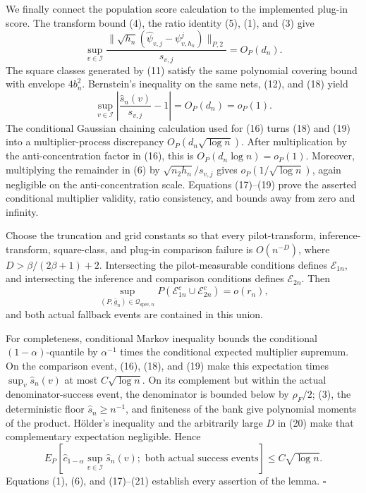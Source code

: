 We finally connect the population score calculation to the implemented plug-in score.  The transform bound (4), the ratio identity (5), (1), and (3) give
\[
 \sup_{v\in\mathcal I}
 \frac{\|\sqrt{h_n}(\widehat\psi_{v,j}-\psi^j_{v,h_n})\|_{P,2}}{s_{v,j}}
 =O_P(d_n). \tag{18}
\]
The square classes generated by (11) satisfy the same polynomial covering bound with envelope \(4b_n^2\).  Bernstein's inequality on the same nets, (12), and (18) yield
\[
 \sup_{v\in\mathcal I}\left|\frac{\widehat s_n(v)}{s_{v,j}}-1\right|=O_P(d_n)=o_P(1). \tag{19}
\]
The conditional Gaussian chaining calculation used for (16) turns (18) and (19) into a multiplier-process discrepancy \(O_P(d_n\sqrt{\log n})\).  After multiplication by the anti-concentration factor in (16), this is \(O_P(d_n\log n)=o_P(1)\).  Moreover, multiplying the remainder in (6) by \(\sqrt{n_2h_n}/s_{v,j}\) gives \(o_P(1/\sqrt{\log n})\), again negligible on the anti-concentration scale.  Equations (17)--(19) prove the asserted conditional multiplier validity, ratio consistency, and bounds away from zero and infinity.

Choose the truncation and grid constants so that every pilot-transform, inference-transform, square-class, and plug-in comparison failure is \(O(n^{-D})\), where \(D>\beta/(2\beta+1)+2\).  Intersecting the pilot-measurable conditions defines \(\mathcal E_{1n}\), and intersecting the inference and comparison conditions defines \(\mathcal E_{2n}\).  Then
\[
 \sup_{(P,\bar g_n)\in\mathcal Q_{\mathrm{spec},n}}
 P(\mathcal E_{1n}^c\cup\mathcal E_{2n}^c)=o(r_n), \tag{20}
\]
and both actual fallback events are contained in this union.

For completeness, conditional Markov inequality bounds the conditional \((1-\alpha)\)-quantile by \(\alpha^{-1}\) times the conditional expected multiplier supremum.  On the comparison event, (16), (18), and (19) make this expectation times \(\sup_v\widehat s_n(v)\) at most \(C\sqrt{\log n}\).  On its complement but within the actual denominator-success event, the denominator is bounded below by \(\rho_F/2\); (3), the deterministic floor \(\widehat s_n\ge n^{-1}\), and finiteness of the bank give polynomial moments of the product.  H\"older's inequality and the arbitrarily large \(D\) in (20) make that complementary expectation negligible.  Hence
\[
 E_P\!\left[\widehat c_{1-\alpha}\sup_{v\in\mathcal I}\widehat s_n(v);
 \text{ both actual success events}\right]\le C\sqrt{\log n}. \tag{21}
\]
Equations (1), (6), and (17)--(21) establish every assertion of the lemma. \(\square\)